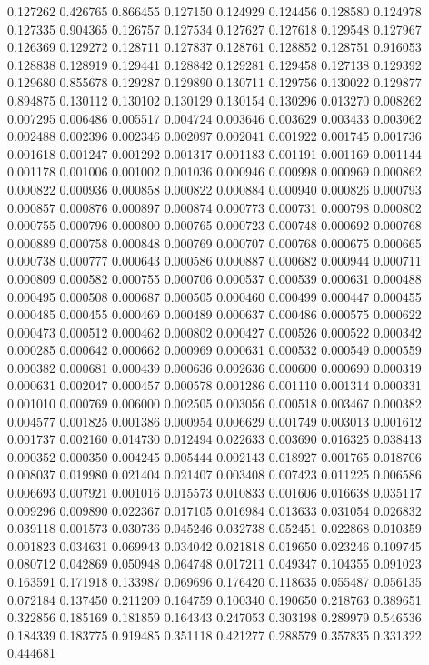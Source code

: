 0.127262
0.426765
0.866455
0.127150
0.124929
0.124456
0.128580
0.124978
0.127335
0.904365
0.126757
0.127534
0.127627
0.127618
0.129548
0.127967
0.126369
0.129272
0.128711
0.127837
0.128761
0.128852
0.128751
0.916053
0.128838
0.128919
0.129441
0.128842
0.129281
0.129458
0.127138
0.129392
0.129680
0.855678
0.129287
0.129890
0.130711
0.129756
0.130022
0.129877
0.894875
0.130112
0.130102
0.130129
0.130154
0.130296
0.013270
0.008262
0.007295
0.006486
0.005517
0.004724
0.003646
0.003629
0.003433
0.003062
0.002488
0.002396
0.002346
0.002097
0.002041
0.001922
0.001745
0.001736
0.001618
0.001247
0.001292
0.001317
0.001183
0.001191
0.001169
0.001144
0.001178
0.001006
0.001002
0.001036
0.000946
0.000998
0.000969
0.000862
0.000822
0.000936
0.000858
0.000822
0.000884
0.000940
0.000826
0.000793
0.000857
0.000876
0.000897
0.000874
0.000773
0.000731
0.000798
0.000802
0.000755
0.000796
0.000800
0.000765
0.000723
0.000748
0.000692
0.000768
0.000889
0.000758
0.000848
0.000769
0.000707
0.000768
0.000675
0.000665
0.000738
0.000777
0.000643
0.000586
0.000887
0.000682
0.000944
0.000711
0.000809
0.000582
0.000755
0.000706
0.000537
0.000539
0.000631
0.000488
0.000495
0.000508
0.000687
0.000505
0.000460
0.000499
0.000447
0.000455
0.000485
0.000455
0.000469
0.000489
0.000637
0.000486
0.000575
0.000622
0.000473
0.000512
0.000462
0.000802
0.000427
0.000526
0.000522
0.000342
0.000285
0.000642
0.000662
0.000969
0.000631
0.000532
0.000549
0.000559
0.000382
0.000681
0.000439
0.000636
0.002636
0.000600
0.000690
0.000319
0.000631
0.002047
0.000457
0.000578
0.001286
0.001110
0.001314
0.000331
0.001010
0.000769
0.006000
0.002505
0.003056
0.000518
0.003467
0.000382
0.004577
0.001825
0.001386
0.000954
0.006629
0.001749
0.003013
0.001612
0.001737
0.002160
0.014730
0.012494
0.022633
0.003690
0.016325
0.038413
0.000352
0.000350
0.004245
0.005444
0.002143
0.018927
0.001765
0.018706
0.008037
0.019980
0.021404
0.021407
0.003408
0.007423
0.011225
0.006586
0.006693
0.007921
0.001016
0.015573
0.010833
0.001606
0.016638
0.035117
0.009296
0.009890
0.022367
0.017105
0.016984
0.013633
0.031054
0.026832
0.039118
0.001573
0.030736
0.045246
0.032738
0.052451
0.022868
0.010359
0.001823
0.034631
0.069943
0.034042
0.021818
0.019650
0.023246
0.109745
0.080712
0.042869
0.050948
0.064748
0.017211
0.049347
0.104355
0.091023
0.163591
0.171918
0.133987
0.069696
0.176420
0.118635
0.055487
0.056135
0.072184
0.137450
0.211209
0.164759
0.100340
0.190650
0.218763
0.389651
0.322856
0.185169
0.181859
0.164343
0.247053
0.303198
0.289979
0.546536
0.184339
0.183775
0.919485
0.351118
0.421277
0.288579
0.357835
0.331322
0.444681
